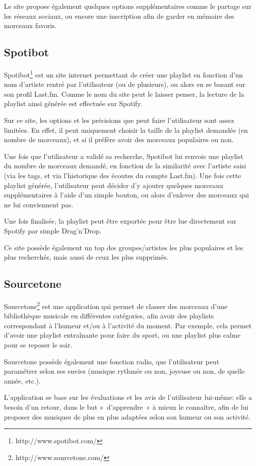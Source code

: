 Le site propose également quelques options supplémentaires comme le partage 
sur les réseaux sociaux, ou encore une inscription afin de garder en mémoire 
des morceaux favoris.

\subsection{Spotibot}
\label{existant:generateurs:spotibot}

Spotibot\footnote{http://www.spotibot.com/} est un site internet permettant de 
créer une playlist en fonction d'un nom d'artiste rentré par l'utilisateur (ou 
de plusieurs), ou alors en se basant sur son profil Last.fm. Comme le nom du 
site peut le laisser penser, la lecture de la playlist ainsi générée est 
effectuée sur Spotify.

Sur ce site, les options et les précisions que peut faire l'utilisateur sont 
assez limitées. En effet, il peut uniquement choisir la taille de la 
playlist demandée (en nombre de morceaux), et si il préfère avoir des 
morceaux populaires ou non.

Une fois que l'utilisateur a validé sa recherche, Spotibot lui renvoie une 
playlist du nombre de morceaux demandé, en fonction de la similarité avec 
l'artiste saisi (via les tags, et via l'historique des écoutes du compte 
Last.fm). Une fois cette playlist générée, l'utilisateur peut décider d'y 
ajouter quelques morceaux supplémentaires à l'aide d'un simple bouton, ou 
alors d'enlever des morceaux qui ne lui conviennent pas.

Une fois finalisée, la playlist peut être exportée pour être lue directement 
sur Spotify par simple Drag'n'Drop.

Ce site possède également un top des groupes/artistes les plus populaires et 
les plus recherchés, mais aussi de ceux les plus supprimés.

\subsection{Sourcetone}
\label{existant:generateurs:sourcetone}

Sourcetone\footnote{http://www.sourcetone.com/} est une application qui permet 
de classer des morceaux d'une bibliothèque musicale en différentes catégories, 
afin avoir des playlists correspondant à l'humeur et/ou à l'activité du moment. 
Par exemple, cela permet d'avoir une playlist entraînante pour faire du sport, 
ou une playlist plus calme pour se reposer le soir.

Sourcetone possède également une fonction radio, que l'utilisateur peut 
paramétrer selon ses envies (musique rythmée ou non, joyeuse ou non, de 
quelle année, etc.).

L'application se base sur les évaluations et les avis de l'utilisateur 
lui-même: elle a besoin d'un retour, dans le but «~d'apprendre~» à mieux le 
connaître, afin de lui proposer des musiques de plus en plus adaptées selon 
son humeur ou son activité.
